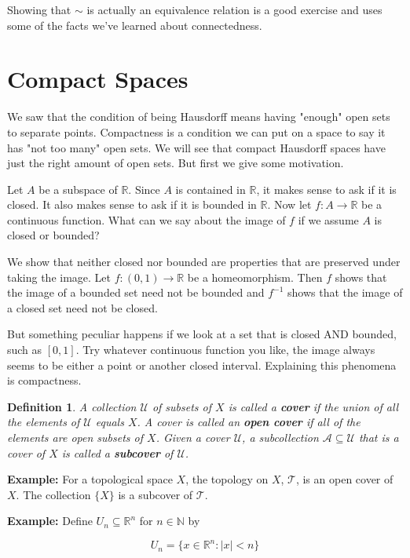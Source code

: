 \documentclass[a4paper]{article}
\newtheorem{definition}[theorem]{Definition}
\numberwithin{theorem}{section}
\begin{document}
Showing that $\sim$ is actually an equivalence relation is a good exercise and uses some of the facts we've learned about connectedness.


\section{Compact Spaces}

We saw that the condition of being Hausdorff means having "enough" open sets to separate points. Compactness is a condition we can put on a space to say it has "not too many" open sets. We will see that compact Hausdorff spaces have just the right amount of open sets. But first we give some motivation.

Let $A$ be a subspace of $\mathbb{R}$. Since $A$ is contained in $\mathbb{R}$, it makes sense to ask if it is closed. It also makes sense to ask if it is bounded in $\mathbb{R}$. Now let $f: A \rightarrow \mathbb{R}$ be a continuous function. What can we say about the image of $f$ if we assume $A$ is closed or bounded?

We show that neither closed nor bounded are properties that are preserved under taking the image. Let $f: (0,1) \rightarrow \mathbb{R}$ be a homeomorphism. Then $f$ shows that the image of a bounded set need not be bounded and $f^{-1}$ shows that the image of a closed set need not be closed.

But something peculiar happens if we look at a set that is closed AND bounded, such as $[0,1]$. Try whatever continuous function you like, the image always seems to be either a point or another closed interval. Explaining this phenomena is compactness.

\begin{definition}
A collection $\mathcal{U}$ of subsets of $X$ is called a \textbf{cover} if the union of all the elements of $\mathcal{U}$ equals $X$. A cover is called an \textbf{open cover} if all of the elements are open subsets of $X$. Given a cover $\mathcal{U}$, a subcollection $\mathcal{A} \subseteq \mathcal{U}$ that is a cover of $X$ is called a \textbf{subcover} of $\mathcal{U}$.
\end{definition}

\textbf{Example:} For a topological space $X$, the topology on $X$, $\mathcal{T}$, is an open cover of $X$. The collection $\{X\}$ is a subcover of $\mathcal{T}$.

\textbf{Example:} Define $U_n \subseteq \mathbb{R}^n$ for $n \in \mathbb{N}$ by

$$ U_n = \{x \in \mathbb{R}^n : |x| < n \} $$
\end{document}
